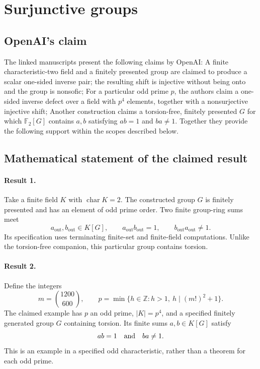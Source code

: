 \documentclass[11pt]{article}
\begin{document}
\section*{Surjunctive groups}

\subsection{OpenAI's claim}
The linked manuscripts present the following claims by OpenAI: A finite characteristic-two field and a finitely presented group are claimed to produce a scalar one-sided inverse pair; the resulting shift is injective without being onto and the group is nonsofic; For a particular odd prime $p$, the authors claim a one-sided inverse defect over a field with $p^4$ elements, together with a nonsurjective injective shift; Another construction claims a torsion-free, finitely presented $G$ for which $\mathbb F_2[G]$ contains $a,b$ satisfying $ab=1$ and $ba\ne1$. Together they provide the following support within the scopes described below.

\subsection{Mathematical statement of the claimed result}
\paragraph{Result 1.} Take a finite field \(K\) with \(\operatorname{char}K=2\). The constructed group \(G\) is finitely presented and has an element of odd prime order. Two finite group-ring sums meet
\[
 a_{\mathrm{out}},b_{\mathrm{out}}\in K[G],\qquad
 a_{\mathrm{out}}b_{\mathrm{out}}=1,\qquad
 b_{\mathrm{out}}a_{\mathrm{out}}\ne1.
\]
Its specification uses terminating finite-set and finite-field computations. Unlike the torsion-free companion, this particular group contains torsion.

\paragraph{Result 2.} Define the integers
\[
 m=\binom{1200}{600},\qquad
 p=\min\{h\in\mathbb Z:h>1,\ h\mid(m!)^2+1\}.
\]
The claimed example has \(p\) an odd prime, \(|K|=p^4\), and a specified finitely generated group \(G\) containing torsion. Its finite sums \(a,b\in K[G]\) satisfy
\[
 ab=1\quad\hbox{and}\quad ba\ne1.
\]
This is an example in a specified odd characteristic, rather than a theorem for each odd prime.
\end{document}
